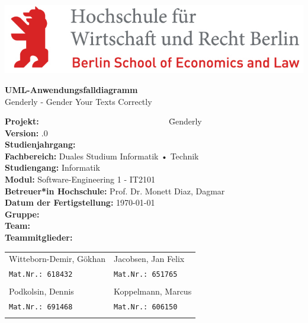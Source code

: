 \hfill
\includegraphics[scale=1]
{Bilder/Logos/HWR_Logo_farbig.jpg}

\begin{center}
	\vspace{1cm}
	\Huge{\textbf{UML-Anwendungsfalldiagramm}}\\
	\vspace{1cm}
	\Large{Genderly - Gender Your Texts Correctly}\\
	\vspace{1cm}
\end{center}{\huge \par}

\begin{doublespacing}
	\begin{large}
		\begin{tabbing}
			
			\textbf{Projekt:} ~~~~~~~~~~~~~~~~~~~~~~~~~~~~~~ \= Genderly \\
			\textbf{Version:} .0 \\
			\textbf{Studienjahrgang:} \\
			\textbf{Fachbereich:} \> Duales Studium Informatik • Technik \\
			\textbf{Studiengang:} \> Informatik \\
			\textbf{Modul:}	 \> Software-Engineering 1 - IT2101\\
			\textbf{Betreuer*in Hochschule:} \> Prof. Dr. Monett Diaz, Dagmar \\
			\textbf{Datum der Fertigstellung:} \> \today \\
			\textbf{Gruppe:} \\
			\textbf{Team:} \\
			\textbf{Teammitglieder:} \>  \\
			
		\end{tabbing}
	\end{large}
\end{doublespacing}


	\vspace{-1cm}
	\begin{tabular}{ll}
		\large{Witteborn-Demir, Gökhan}  &  \large{Jacobsen, Jan Felix}\\
	    \texttt{Mat.Nr.: 618432}    	 &  \texttt{Mat.Nr.: 651765}\\
		& \\
		\large{Podkolsin, Dennis}   	 &  \large{Koppelmann, Marcus}\\
		\texttt{Mat.Nr.: 691468}    	 &  \texttt{Mat.Nr.: 606150}\\
		& \\
	\end{tabular}

	
	\pagebreak
	

